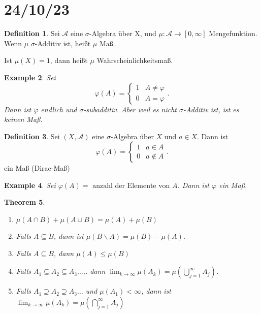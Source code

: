 \documentclass[prb,12pt]{revtex4-2}
\newtheorem{Theorem}{Theorem}
\newtheorem{Example}[Theorem]{Example}
\theoremstyle{definition}
\theoremstyle{definition}
\newtheorem{Definition}[Theorem]{Definition}
\begin{document}
\section{24/10/23}
\begin{Definition}
	Sei $\mathcal{A}$ eine $\sigma$-Algebra \"{u}ber X, und $\mu:\mathcal{A}\to [0,\infty]$ Mengefunktion. Wenn $\mu$ $\sigma$-Additiv ist, heißt $\mu$ Maß. 

	Ist $\mu(X)=1$, dann heißt $\mu$ Wahrscheinlichkeitsmaß.
\end{Definition}
\begin{Example}
	Sei
	\[
	\varphi(A)=\begin{cases}
		1 & A \neq \varphi\\
		0 & A = \varphi
	\end{cases}
	.\] 
	Dann ist $\varphi$ endlich und $\sigma$-subadditiv. Aber weil es nicht $\sigma$-Additiv ist, ist es keinen Maß. 
\end{Example}
\begin{Definition}
	Sei $(X, \mathcal{A})$ eine $\sigma$-Algebra \"{u}ber $X$ und $a\in X$. Dann ist
	\[
	\varphi(A)=\begin{cases}
		1 & a \in A\\
		0 & a \not\in A
	\end{cases}
	.\] 
	ein Maß (Dirac-Maß)
\end{Definition}
\begin{Example}
	Sei $\varphi(A)=\text{ anzahl der Elemente von }A$. Dann ist $\varphi$ ein Maß. 
\end{Example}

\begin{Theorem}
	\begin{enumerate}
		\item $\mu(A \cap B)+\mu(A \cup B)=\mu(A)+\mu(B)$
		\item Falls $A\subseteq B$, dann ist $\mu(B\backslash A)=\mu(B)-\mu(A)$.
		\item Falls $A\subseteq B$, dann $\mu(A)\le \mu(B)$
		\item Falls $A_1\subseteq A_2\subseteq A_3\dots$,. dann $\lim_{k \to \infty} \mu(A_k)=\mu\left( \bigcup_{j=1} ^\infty A_j \right) $.
		\item Falls $A_1\supseteq A_2\supseteq A_3\dots$ und $\mu(A_1)<\infty$, dann ist $\lim_{k \to \infty} \mu(A_k)=\mu\left( \bigcap_{j=1} ^\infty A_j \right) $
	\end{enumerate}
\end{Theorem}
\end{document}
